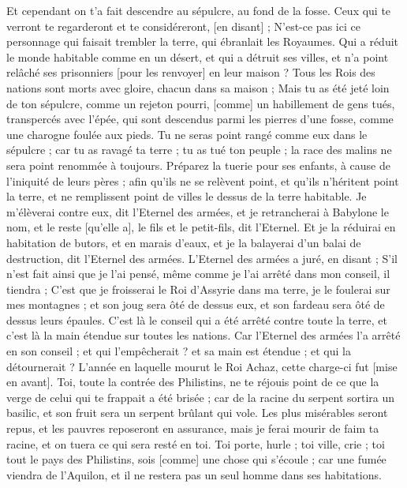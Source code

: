\begin{multicols}{2}
Et cependant on t'a fait descendre au sépulcre, au fond de la fosse.
Ceux qui te verront te regarderont et te considéreront, [en disant] ; N'est-ce pas ici ce personnage qui faisait trembler la terre, qui ébranlait les Royaumes.
Qui a réduit le monde habitable comme en un désert, et qui a détruit ses villes, et n'a point relâché ses prisonniers [pour les renvoyer] en leur maison ?
Tous les Rois des nations sont morts avec gloire, chacun dans sa maison ;
Mais tu as été jeté loin de ton sépulcre, comme un rejeton pourri, [comme] un habillement de gens tués, transpercés avec l'épée, qui sont descendus parmi les pierres d'une fosse, comme une charogne foulée aux pieds.
Tu ne seras point rangé comme eux dans le sépulcre ; car tu as ravagé ta terre ; tu as tué ton peuple ; la race des malins ne sera point renommée à toujours.
Préparez la tuerie pour ses enfants, à cause de l'iniquité de leurs pères ; afin qu'ils ne se relèvent point, et qu'ils n'héritent point la terre, et ne remplissent point de villes le dessus de la terre habitable.
Je m'élèverai contre eux, dit l'Eternel des armées, et je retrancherai à Babylone le nom, et le reste [qu'elle a], le fils et le petit-fils, dit l'Eternel.
Et je la réduirai en habitation de butors, et en marais d'eaux, et je la balayerai d'un balai de destruction, dit l'Eternel des armées.
L'Eternel des armées a juré, en disant ; S'il n'est fait ainsi que je l'ai pensé, même comme je l'ai arrêté dans mon conseil, il tiendra ;
C'est que je froisserai le Roi d'Assyrie dans ma terre, je le foulerai sur mes montagnes ; et son joug sera ôté de dessus eux, et son fardeau sera ôté de dessus leurs épaules.
C'est là le conseil qui a été arrêté contre toute la terre, et c'est là la main étendue sur toutes les nations.
Car l'Eternel des armées l'a arrêté en son conseil ; et qui l'empêcherait ? et sa main est étendue ; et qui la détournerait ?
L'année en laquelle mourut le Roi Achaz, cette charge-ci fut [mise en avant].
Toi, toute la contrée des Philistins, ne te réjouis point de ce que la verge de celui qui te frappait a été brisée ; car de la racine du serpent sortira un basilic, et son fruit sera un serpent brûlant qui vole.
Les plus misérables seront repus, et les pauvres reposeront en assurance, mais je ferai mourir de faim ta racine, et on tuera ce qui sera resté en toi.
Toi porte, hurle ; toi ville, crie ; toi tout le pays des Philistins, sois [comme] une chose qui s'écoule ; car une fumée viendra de l'Aquilon, et il ne restera pas un seul homme dans ses habitations.

\end{multicols}
